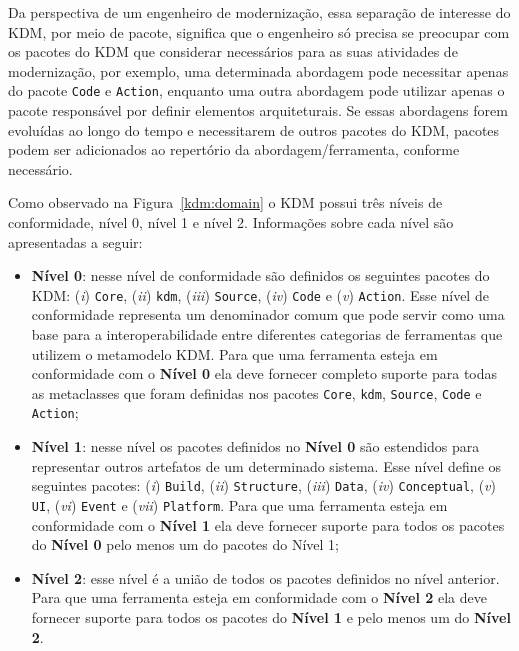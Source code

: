 Da perspectiva de um engenheiro de modernização, essa separação de interesse do KDM, por meio de pacote, significa que o engenheiro só precisa se preocupar com os pacotes do KDM que considerar necessários para as suas atividades de modernização, por exemplo, uma determinada abordagem pode necessitar apenas do pacote \texttt{Code} e \texttt{Action}, enquanto uma outra abordagem pode utilizar apenas o pacote responsável por definir elementos arquiteturais. Se essas abordagens forem evoluídas ao longo do tempo e necessitarem de outros pacotes do KDM, pacotes podem ser adicionados ao repertório da abordagem/ferramenta, conforme necessário.

Como observado na Figura~\ref{kdm:domain} o KDM possui três níveis de conformidade, nível 0, nível 1 e nível 2. Informações sobre cada nível são apresentadas a seguir:

\begin{itemize}
    \item \textbf{Nível 0}: nesse nível de conformidade são definidos os seguintes pacotes do KDM: (\textit{i})     \texttt{Core}, (\textit{ii}) \texttt{kdm}, (\textit{iii}) \texttt{Source}, (\textit{iv}) \texttt{Code} e (\textit{v}) \texttt{Action}. Esse nível de conformidade representa um denominador comum que pode servir como uma base para a interoperabilidade entre diferentes categorias de ferramentas que utilizem o metamodelo KDM. Para que uma ferramenta esteja em conformidade com o \textbf{Nível 0} ela deve fornecer completo suporte para todas as metaclasses que foram definidas nos pacotes \texttt{Core}, \texttt{kdm}, \texttt{Source}, \texttt{Code} e \texttt{Action};
    \item \textbf{Nível 1}: nesse nível os pacotes definidos no \textbf{Nível 0} são estendidos para representar outros artefatos de um determinado sistema. Esse nível define os seguintes pacotes: (\textit{i}) \texttt{Build}, (\textit{ii}) \texttt{Structure}, (\textit{iii}) \texttt{Data}, (\textit{iv}) \texttt{Conceptual}, (\textit{v}) \texttt{UI}, (\textit{vi}) \texttt{Event} e (\textit{vii}) \texttt{Platform}. Para que uma ferramenta esteja em conformidade com o \textbf{Nível 1} ela deve fornecer suporte para todos os pacotes do \textbf{Nível 0} pelo menos um do pacotes do Nível 1;
    \item \textbf{Nível 2}: esse nível é a união de todos os pacotes definidos no nível anterior. Para que uma ferramenta esteja em conformidade com o \textbf{Nível 2} ela deve fornecer suporte para todos os pacotes do \textbf{Nível 1} e pelo menos um do \textbf{Nível 2}.
\end{itemize}


